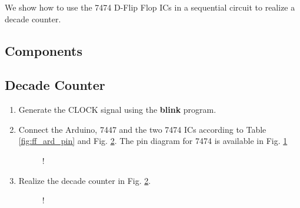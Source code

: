 We show how to use the 7474 D-Flip Flop ICs in
a sequential circuit to realize a decade counter.
\subsection{Components}
\begin{table}[H]
\centering

\caption{}
\label{table:components-7474}
\end{table}

\subsection{Decade Counter}
\begin{enumerate}[label=\arabic*.,ref=\theenumi]
\item
Generate the CLOCK signal using the \textbf{blink} program. 


\item
Connect the Arduino, 7447 and the two 7474 ICs according to Table \ref{fig:ff_ard_pin} and Fig. \ref{fig:decade_counter}. The pin diagram for 7474 is available in Fig. \ref{fig:7474}
			\begin{table}[H]
\centering

\caption{}
\label{fig:ff_ard_pin}
\end{table}
%
\begin{figure}[H]
\begin{center}
\resizebox {\columnwidth} {!} {

}
\end{center}
\caption{}
\label{fig:7474}
\end{figure}

%
\item
			\iffalse
Intelligently use the code in 
\begin{lstlisting}
ide/7447/codes/inc_dec/inc_dec.ino
\end{lstlisting}
and
			
\begin{lstlisting}
wget https://raw.githubusercontent.com/gadepall/arduino/master/7447/codes/ip_inc_dec/ip_inc_dec.ino
\end{lstlisting}
\fi
Realize the decade counter in Fig. \ref{fig:decade_counter}.
 
 \begin{figure}[H]
\begin{center}
\resizebox {\columnwidth} {!} {

}
\end{center}
\caption{}
\label{fig:decade_counter}
\end{figure}
%

	\end{enumerate}


